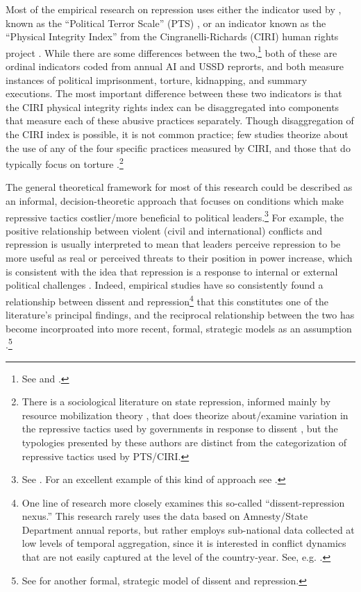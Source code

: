 \documentclass[11pt]{article}
\begin{document}
Most of the empirical research on repression uses either the indicator used by \citet{PoeTate1994}, known as the ``Political Terror Scale'' (PTS) \citep{GibneyCornettWood2009}, or an indicator known as the ``Physical Integrity Index'' from the Cingranelli-Richards (CIRI) human rights project \citep{CIRI2010}. While there are some differences between the two,\footnote{See \citet{WoodGibney2010} and \citet{CingranelliRichards2010}.} both of these are ordinal indicators coded from annual AI and USSD reprorts, and both measure instances of political imprisonment, torture, kidnapping, and summary executions. The most important difference between these two indicators is that the CIRI physical integrity rights index can be disaggregated into components that measure each of these abusive practices separately. Though disaggregation of the CIRI index is possible, it is not common practice; few studies theorize about the use of any of the four specific practices measured by CIRI, and those that do typically focus on torture \citep[See, e.g.][]{Hathaway2004,Rejali2007,ConradMoore2010,Conrad2012,ConradRitter2013}.\footnote{There is a sociological literature on state repression, informed mainly by resource mobilization theory \citep[See, e.g.][]{Tilly1978}, that does theorize about/examine variation in the repressive tactics used by governments in response to dissent \citep[See, e.g.][]{DellaPorta1996,Earl2003,Boykoff2007}, but the typologies presented by these authors are distinct from the categorization of repressive tactics used by PTS/CIRI.} 

The general theoretical framework for most of this research could be described as an informal, decision-theoretic approach that focuses on conditions which make repressive tactics costlier/more beneficial to political leaders.\footnote{See \citet{Davenport2007AR}. For an excellent example of this kind of approach see \citet{Poe2004}.} For example, the positive relationship between violent (civil and international) conflicts and repression is usually interpreted to mean that leaders perceive repression to be more useful as real or perceived threats to their position in power increase, which is consistent with the idea that repression is a response to internal or external political challenges \citep[See, e.g.][]{Tilly1978,Tilly1985,Gurr1986,Gurr1988,Davenport1995}. Indeed, empirical studies have so consistently found a relationship between dissent and repression\footnote{One line of research more closely examines this so-called ``dissent-repression nexus.'' This research rarely uses the data based on Amnesty/State Department annual reports, but rather employs sub-national data collected at low levels of temporal aggregation, since it is interested in conflict dynamics that are not easily captured at the level of the country-year. See, e.g. \citet{Francisco1995,Moore1995jcr,Francisco1996,Rasler1996,Moore1998,Davenport2005,Shellman2006,
FieldingShortland2010}.} that this constitutes one of the literature's principal findings, and the reciprocal relationship between the two has become incorproated into more recent, formal, strategic models as an assumption \citep{RitterJCR}.\footnote{See \citet{Pierskalla2010} for another formal, strategic model of dissent and repression.} 
\end{document}
